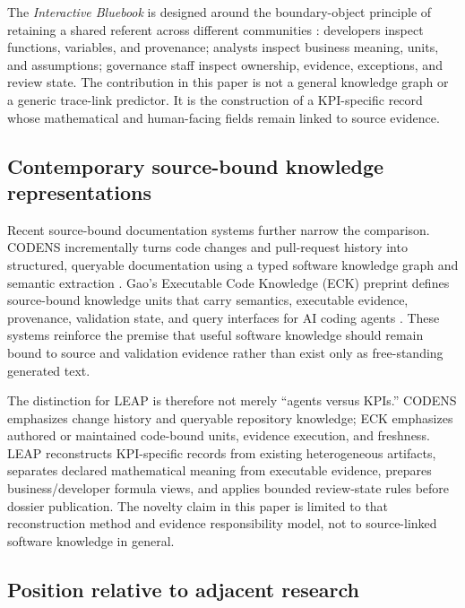 \documentclass[a4paper,fleqn]{cas-dc}
\newcommand{\bluebook}{\emph{Interactive Bluebook}}
\begin{document}
The \bluebook{} is designed around the boundary-object principle of retaining a shared referent across different communities \citep{StarGriesemer1989}: developers inspect functions, variables, and provenance; analysts inspect business meaning, units, and assumptions; governance staff inspect ownership, evidence, exceptions, and review state. The contribution in this paper is not a general knowledge graph or a generic trace-link predictor. It is the construction of a KPI-specific record whose mathematical and human-facing fields remain linked to source evidence.

\subsection{Contemporary source-bound knowledge representations}

Recent source-bound documentation systems further narrow the comparison. CODENS incrementally turns code changes and pull-request history into structured, queryable documentation using a typed software knowledge graph and semantic extraction \citep{Kelious2026}. Gao's Executable Code Knowledge (ECK) preprint defines source-bound knowledge units that carry semantics, executable evidence, provenance, validation state, and query interfaces for AI coding agents \citep{Gao2026}. These systems reinforce the premise that useful software knowledge should remain bound to source and validation evidence rather than exist only as free-standing generated text.

The distinction for LEAP is therefore not merely ``agents versus KPIs.'' CODENS emphasizes change history and queryable repository knowledge; ECK emphasizes authored or maintained code-bound units, evidence execution, and freshness. LEAP reconstructs KPI-specific records from existing heterogeneous artifacts, separates declared mathematical meaning from executable evidence, prepares business/developer formula views, and applies bounded review-state rules before dossier publication. The novelty claim in this paper is limited to that reconstruction method and evidence responsibility model, not to source-linked software knowledge in general.

\subsection{Position relative to adjacent research}
\end{document}
